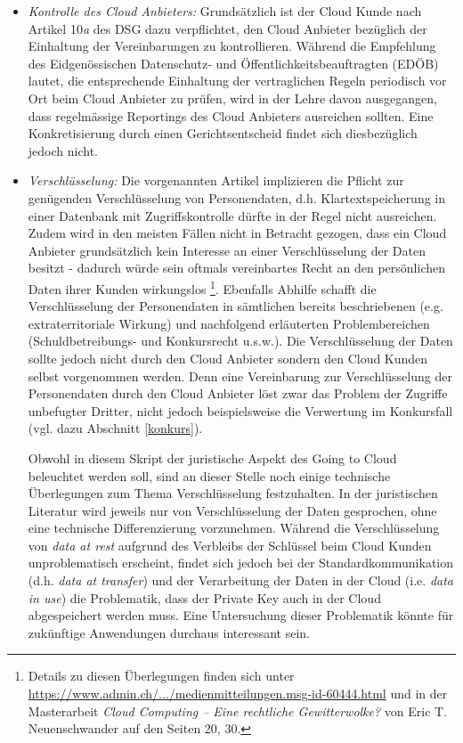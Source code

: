 \documentclass[a4paper,pointlessnumbers]{scrreprt}
\begin{document}
\begin{itemize}[itemsep=0pt]
\item \textit{Kontrolle des Cloud Anbieters:} Grundsätzlich ist der Cloud Kunde nach Artikel 10\textit{a} des DSG dazu verpflichtet, den Cloud Anbieter bezüglich der Einhaltung der Vereinbarungen zu kontrollieren. Während die Empfehlung des Eidgenössischen Datenschutz- und Öffentlichkeitsbeauftragten (EDÖB) lautet, die entsprechende Einhaltung der vertraglichen Regeln periodisch vor Ort beim Cloud Anbieter zu prüfen, wird in der Lehre davon ausgegangen, dass regelmässige Reportings des Cloud Anbieters ausreichen sollten. Eine Konkretisierung durch einen Gerichtsentscheid findet sich diesbezüglich jedoch nicht.
\item \textit{Verschlüsselung:} Die vorgenannten Artikel implizieren die Pflicht zur \glqq genügenden\grqq{} Verschlüsselung von Personendaten, d.h. Klartextspeicherung in einer Datenbank mit Zugriffskontrolle dürfte in der Regel nicht ausreichen. Zudem wird in den meisten Fällen nicht in Betracht gezogen, dass ein Cloud Anbieter grundsätzlich kein Interesse an einer Verschlüsselung der Daten besitzt - dadurch würde sein oftmals vereinbartes Recht an den persönlichen Daten ihrer Kunden wirkungslos \footnote{Details zu diesen Überlegungen finden sich unter \href{https://www.admin.ch/gov/de/start/dokumentation/medienmitteilungen.msg-id-60444.html}{https://www.admin.ch/.../medienmitteilungen.msg-id-60444.html} und in der Masterarbeit \textit{Cloud Computing – Eine rechtliche Gewitterwolke?} von Eric T. Neuenschwander auf den Seiten 20, 30.}. Ebenfalls Abhilfe schafft die Verschlüsselung der Personendaten in sämtlichen bereits beschriebenen (e.g. extraterritoriale Wirkung) und nachfolgend erläuterten Problembereichen (Schuldbetreibungs- und Konkursrecht u.s.w.). Die Verschlüsselung der Daten sollte jedoch nicht durch den Cloud Anbieter sondern den Cloud Kunden selbst vorgenommen werden. Denn eine Vereinbarung zur Verschlüsselung der Personendaten durch den Cloud Anbieter löst zwar das Problem der Zugriffe unbefugter Dritter, nicht jedoch beispielsweise die Verwertung im Konkursfall (vgl. dazu Abschnitt \ref{konkurs}).

Obwohl in diesem Skript der juristische Aspekt des Going to Cloud beleuchtet werden soll, sind an dieser Stelle noch einige technische Überlegungen zum Thema Verschlüsselung festzuhalten. In der juristischen Literatur wird jeweils nur von Verschlüsselung der Daten gesprochen, ohne eine technische Differenzierung vorzunehmen. Während die Verschlüsselung von \textit{data at rest} aufgrund des Verbleibs der Schlüssel beim Cloud Kunden unproblematisch erscheint, findet sich jedoch bei der Standardkommunikation (d.h. \textit{data at transfer}) und der Verarbeitung der Daten in der Cloud (i.e. \textit{data in use}) die Problematik, dass der Private Key auch in der Cloud abgespeichert werden muss. Eine Untersuchung dieser Problematik könnte für zukünftige Anwendungen durchaus interessant sein.
\end{itemize}
\end{document}
